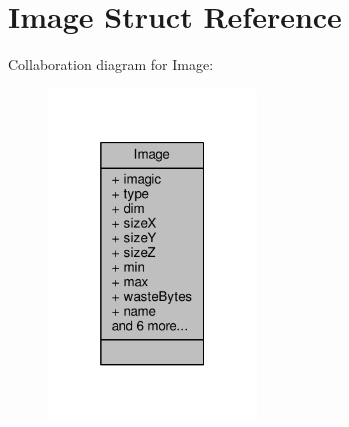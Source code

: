\hypertarget{structImage}{}\section{Image Struct Reference}
\label{structImage}


Collaboration diagram for Image\+:\nopagebreak
\begin{figure}[H]
\begin{center}
\leavevmode
\includegraphics[width=157pt]{structImage__coll__graph}
\end{center}
\end{figure}

